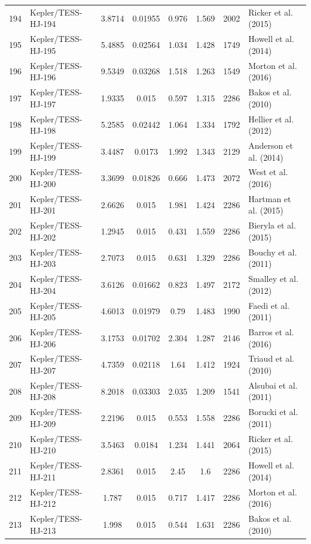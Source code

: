 \begin{longtable}{r l c c c c c p{4.2cm}}
194 & Kepler/TESS-HJ-194 & 3.8714 & 0.01955 & 0.976 & 1.569 & 2002 & Ricker et al. (2015) \\
195 & Kepler/TESS-HJ-195 & 5.4885 & 0.02564 & 1.034 & 1.428 & 1749 & Howell et al. (2014) \\
196 & Kepler/TESS-HJ-196 & 9.5349 & 0.03268 & 1.518 & 1.263 & 1549 & Morton et al. (2016) \\
197 & Kepler/TESS-HJ-197 & 1.9335 & 0.015 & 0.597 & 1.315 & 2286 & Bakos et al. (2010) \\
198 & Kepler/TESS-HJ-198 & 5.2585 & 0.02442 & 1.064 & 1.334 & 1792 & Hellier et al. (2012) \\
199 & Kepler/TESS-HJ-199 & 3.4487 & 0.0173 & 1.992 & 1.343 & 2129 & Anderson et al. (2014) \\
200 & Kepler/TESS-HJ-200 & 3.3699 & 0.01826 & 0.666 & 1.473 & 2072 & West et al. (2016) \\
201 & Kepler/TESS-HJ-201 & 2.6626 & 0.015 & 1.981 & 1.424 & 2286 & Hartman et al. (2015) \\
202 & Kepler/TESS-HJ-202 & 1.2945 & 0.015 & 0.431 & 1.559 & 2286 & Bieryla et al. (2015) \\
203 & Kepler/TESS-HJ-203 & 2.7073 & 0.015 & 0.631 & 1.329 & 2286 & Bouchy et al. (2011) \\
204 & Kepler/TESS-HJ-204 & 3.6126 & 0.01662 & 0.823 & 1.497 & 2172 & Smalley et al. (2012) \\
205 & Kepler/TESS-HJ-205 & 4.6013 & 0.01979 & 0.79 & 1.483 & 1990 & Faedi et al. (2011) \\
206 & Kepler/TESS-HJ-206 & 3.1753 & 0.01702 & 2.304 & 1.287 & 2146 & Barros et al. (2016) \\
207 & Kepler/TESS-HJ-207 & 4.7359 & 0.02118 & 1.64 & 1.412 & 1924 & Triaud et al. (2010) \\
208 & Kepler/TESS-HJ-208 & 8.2018 & 0.03303 & 2.035 & 1.209 & 1541 & Alsubai et al. (2011) \\
209 & Kepler/TESS-HJ-209 & 2.2196 & 0.015 & 0.553 & 1.558 & 2286 & Borucki et al. (2011) \\
210 & Kepler/TESS-HJ-210 & 3.5463 & 0.0184 & 1.234 & 1.441 & 2064 & Ricker et al. (2015) \\
211 & Kepler/TESS-HJ-211 & 2.8361 & 0.015 & 2.45 & 1.6 & 2286 & Howell et al. (2014) \\
212 & Kepler/TESS-HJ-212 & 1.787 & 0.015 & 0.717 & 1.417 & 2286 & Morton et al. (2016) \\
213 & Kepler/TESS-HJ-213 & 1.998 & 0.015 & 0.544 & 1.631 & 2286 & Bakos et al. (2010) \\

\end{longtable}
